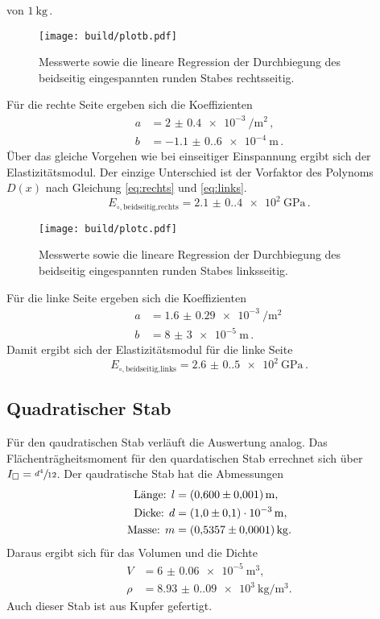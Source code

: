 von $\qty{1}{\kilo\gram}$\,. 
\begin{figure}[H]
    \centering
    \caption{Messwerte sowie die lineare Regression der Durchbiegung des beidseitig eingespannten runden Stabes rechtsseitig.}
    \texttt{[image: build/plotb.pdf]}
    \label{fig:plotb}
\end{figure}
Für die rechte Seite ergeben sich die Koeffizienten 
\begin{align*}
    a&=\qty{2(0.4)e-3}{\per\meter\squared}\,,\\
    b&=\qty{-1.1(0.6)e-4}{\meter}\,.
\end{align*}
Über das gleiche Vorgehen wie bei einseitiger Einspannung ergibt sich der Elastizitätsmodul. Der einzige Unterschied ist 
der Vorfaktor des Polynoms $D(x)$ nach Gleichung \eqref{eq:rechts} und \eqref{eq:links}.
\begin{equation*}
E_{\circ,\text{beidseitig,rechts}}=\qty{2.1(0.4)e2}{\giga\pascal}\,.
\end{equation*}
\begin{figure}[H]
    \centering
    \caption{Messwerte sowie die lineare Regression der Durchbiegung des beidseitig eingespannten runden Stabes linksseitig.}
    \texttt{[image: build/plotc.pdf]}
    \label{fig:plotc}
\end{figure}
Für die linke Seite ergeben sich die Koeffizienten
\begin{align*}
    a&=\qty{1,6(0.29)e-3}{\per\meter\squared}\,\\
    b&=\qty{8(3)e-5}{\meter}\,.
\end{align*}
Damit ergibt sich der Elastizitätsmodul für die linke Seite
\begin{equation*}
    E_{\circ,\text{beidseitig,links}}=\qty{2.6(0.5)e2}{\giga\pascal}\,.
\end{equation*}
\subsection{Quadratischer Stab}
Für den qaudratischen Stab verläuft die Auswertung analog. Das Flächenträgheitsmoment für den quardatischen Stab errechnet sich
über $I_\square=\sfrac{d^4}{12}$. Der qaudratische Stab hat die Abmessungen 
\begin{align*}
    \text{Länge: } l&=\qty{0,6(0.001)}{\meter},\\
    \text{Dicke: } d&=\qty{1,0(0,1)e-3}{\meter},\\
    \text{Masse: } m&=\qty{0,5357(0.0001)}{\kilo\gram}.
\end{align*}
Daraus ergibt sich für das Volumen und die Dichte 
\begin{align*}
    V&=\qty{6(0.06)e-5}{\meter\cubed},\\
    \rho&=\qty{8.93(0.09)e3}{\kilo\gram\per\meter\cubed}.
\end{align*}
Auch dieser Stab ist aus Kupfer gefertigt.

